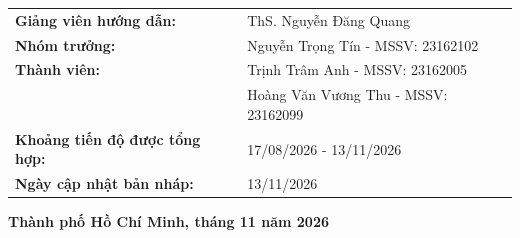 \documentclass[12pt,a4paper,oneside]{report}
\begin{document}
\begin{titlepage}
\begin{center}
{\begin{tabularx}{0.86\textwidth}{L{6.0cm}Y}
    \textbf{Giảng viên hướng dẫn:} & ThS. Nguyễn Đăng Quang \\
    \textbf{Nhóm trưởng:} & Nguyễn Trọng Tín - MSSV: 23162102 \\
    \textbf{Thành viên:} & Trịnh Trâm Anh - MSSV: 23162005 \\
    & Hoàng Văn Vương Thu - MSSV: 23162099 \\
    \textbf{Khoảng tiến độ được tổng hợp:} & 17/08/2026 - 13/11/2026 \\
    \textbf{Ngày cập nhật bản nháp:} & 13/11/2026 \\
  \end{tabularx}}
\end{center}
\vfill
\begin{center}{\bfseries Thành phố Hồ Chí Minh, tháng 11 năm 2026}\end{center}
\end{titlepage}
\end{document}
